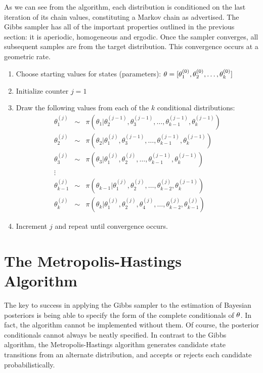 \documentclass[letterpaper,10pt,english]{sphinxmanual}
\begin{document}
As we can see from the algorithm, each distribution is conditioned on the last
iteration of its chain values, constituting a Markov chain as advertised. The
Gibbs sampler has all of the important properties outlined in the previous
section: it is aperiodic, homogeneous and ergodic. Once the sampler converges,
all subsequent samples are from the target distribution. This convergence occurs
at a geometric rate.
\begin{enumerate}
\item {} 
Choose starting values for states (parameters): ${\bf \theta} = [\theta_1^{(0)},\theta_2^{(0)},\ldots,\theta_k^{(0)}]$

\item {} 
Initialize counter $j=1$

\item {} 
Draw the following values from each of the $k$ conditional distributions:
\begin{eqnarray*}
\theta_1^{(j)} &\sim& \pi(\theta_1 | \theta_2^{(j-1)},\theta_3^{(j-1)},\ldots,\theta_{k-1}^{(j-1)},\theta_k^{(j-1)}) \\
\theta_2^{(j)} &\sim& \pi(\theta_2 | \theta_1^{(j)},\theta_3^{(j-1)},\ldots,\theta_{k-1}^{(j-1)},\theta_k^{(j-1)}) \\
\theta_3^{(j)} &\sim& \pi(\theta_3 | \theta_1^{(j)},\theta_2^{(j)},\ldots,\theta_{k-1}^{(j-1)},\theta_k^{(j-1)}) \\
\vdots \\
\theta_{k-1}^{(j)} &\sim& \pi(\theta_{k-1} | \theta_1^{(j)},\theta_2^{(j)},\ldots,\theta_{k-2}^{(j)},\theta_k^{(j-1)}) \\
\theta_k^{(j)} &\sim& \pi(\theta_k | \theta_1^{(j)},\theta_2^{(j)},\theta_4^{(j)},\ldots,\theta_{k-2}^{(j)},\theta_{k-1}^{(j)})
\end{eqnarray*}
\item {} 
Increment $j$ and repeat until convergence occurs.

\end{enumerate}


\section{The Metropolis-Hastings Algorithm}
\label{theory:the-metropolis-hastings-algorithm}
The key to success in applying the Gibbs sampler to the estimation of Bayesian
posteriors is being able to specify the form of the complete conditionals of
${\bf \theta}$. In fact, the algorithm cannot be implemented without them.
Of course, the posterior conditionals cannot always be neatly specified. In
contrast to the Gibbs algorithm, the Metropolis-Hastings algorithm generates
candidate state transitions from an alternate distribution, and accepts or
rejects each candidate probabilistically.
\end{document}
